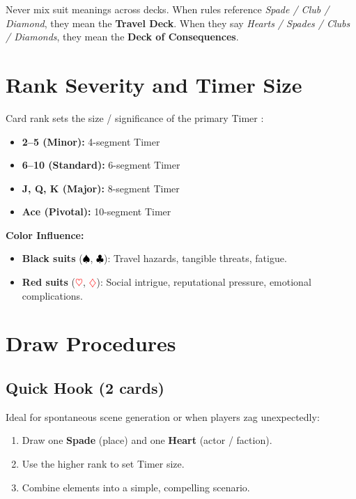 \begin{tcolorbox}[title=Important, colback=red!5!white, colframe=red!75!black,breakable]
Never mix suit meanings across decks. When rules reference \emph{Spade / Club / Diamond}, they mean the \textbf{Travel Deck}. When they say \emph{Hearts / Spades / Clubs / Diamonds}, they mean the \textbf{Deck of Consequences}.
\end{tcolorbox}

\section{Rank Severity and Timer Size}\label{sec:rank_severity}

Card rank sets the size / significance of the primary Timer :

\begin{itemize}
    \item \textbf{2--5 (Minor):}  4-segment Timer 
    \item \textbf{6--10 (Standard):} 6-segment Timer 
    \item \textbf{J, Q, K (Major):} 8-segment Timer 
    \item \textbf{Ace (Pivotal):} 10-segment Timer 
\end{itemize}

\noindent \textbf{Color Influence:}
\begin{itemize}
    \item \textbf{Black suits} (\textcolor{black}{$\spadesuit$}, \textcolor{black}{$\clubsuit$}): Travel hazards, tangible threats, fatigue. 
    \item \textbf{Red suits} (\textcolor{red}{$\heartsuit$}, \textcolor{red}{$\diamondsuit$}): Social intrigue, reputational pressure, emotional complications. 
\end{itemize}

\section{Draw Procedures}\label{sec:draw_procedures}

\subsection{Quick Hook (2 cards)}\label{subsec:quick_hook}
Ideal for spontaneous scene generation or when players zag unexpectedly:
\begin{enumerate}
    \item Draw one \textbf{Spade} (place) and one \textbf{Heart} (actor / faction).
    \item Use the higher rank to set Timer size.
    \item Combine elements into a simple, compelling scenario.
\end{enumerate}

